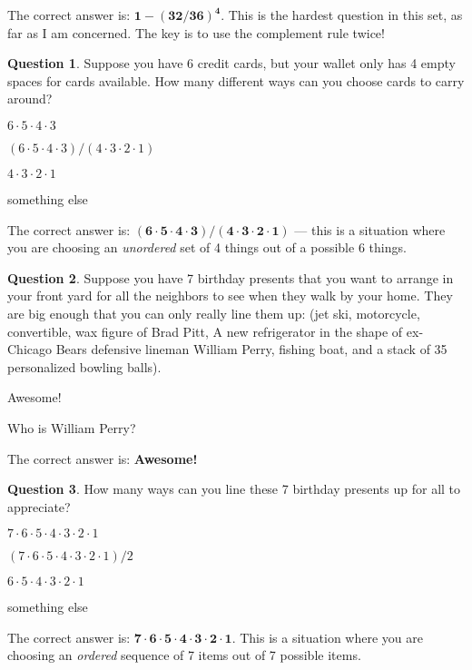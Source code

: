 \documentclass[12pt]{amsart}
\theoremstyle{definition}
\newtheorem{question}{Question}
\begin{document}
The correct answer is: $\mathbf{1 - (32/36)^4}$. This is the hardest question in this set, as far as I am concerned. The key is to use the complement rule twice!


\begin{question}
Suppose you have 6 credit cards, but your wallet only has 4 empty spaces for cards available. How many different ways can you choose cards to carry around?
\begin{compactitem}
\item $6\cdot 5 \cdot 4 \cdot 3$
\item $(6\cdot 5 \cdot 4 \cdot 3) / (4\cdot 3 \cdot 2 \cdot 1)$
\item $ 4\cdot 3 \cdot 2 \cdot 1$
\item something else
\end{compactitem}
\end{question}

The correct answer is: $\mathbf{(6\cdot 5 \cdot 4 \cdot 3) / (4\cdot 3 \cdot 2 \cdot 1)}$ --- this is a situation where you are choosing an \emph{unordered} set of 4 things out of a possible 6 things.


\begin{question}
Suppose you have 7 birthday presents that you want to arrange in your front yard for all the neighbors to see when they walk by your home. They are big enough that you can only really line them up: (jet ski, motorcycle, convertible, wax figure of Brad Pitt, A new refrigerator in the shape of ex-Chicago Bears defensive lineman William Perry, fishing boat, and a stack of 35 personalized bowling balls).
\begin{compactitem}
\item Awesome!
\item Who is William Perry?
\end{compactitem}
\end{question}

The correct answer is: \textbf{Awesome!}


\begin{question}
How many ways can you line these 7 birthday presents up for all to appreciate?
\begin{compactitem}
\item $7\cdot 6 \cdot 5 \cdot 4 \cdot 3 \cdot 2 \cdot 1$
\item $(7\cdot 6 \cdot 5 \cdot 4 \cdot 3 \cdot 2 \cdot 1)/2$
\item $ 6 \cdot 5 \cdot 4 \cdot 3 \cdot 2 \cdot 1$
\item something else
\end{compactitem}
\end{question}

The correct answer is:  $\mathbf{7\cdot 6 \cdot 5 \cdot 4 \cdot 3 \cdot 2 \cdot 1}$. This is a situation where you are choosing an \emph{ordered} sequence of 7 items out of 7 possible items.
\end{document}
